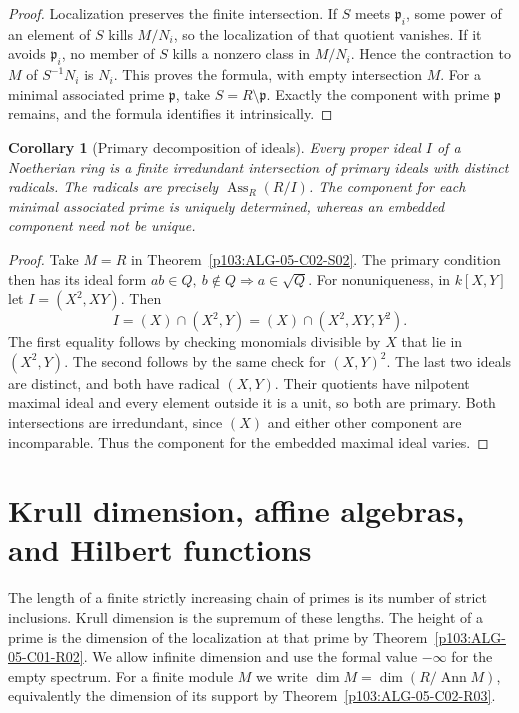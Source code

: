 \documentclass[11pt,oneside,openany]{book}
\newtheorem{corollary}[theorem]{Corollary}
\theoremstyle{definition}
\theoremstyle{remark}
\begin{document}
\begin{proof}
Localization preserves the finite intersection. If \(S\) meets \(\mathfrak p_i\), some power of an element of \(S\) kills \(M/N_i\), so the localization of that quotient vanishes. If it avoids \(\mathfrak p_i\), no member of \(S\) kills a nonzero class in \(M/N_i\). Hence the contraction to \(M\) of \(S^{-1}N_i\) is \(N_i\). This proves the formula, with empty intersection \(M\). For a minimal associated prime \(\mathfrak p\), take \(S=R\setminus\mathfrak p\). Exactly the component with prime \(\mathfrak p\) remains, and the formula identifies it intrinsically.
\end{proof}

\begin{corollary}[Primary decomposition of ideals]\label{p103:ALG-05-C02-R02}
Every proper ideal \(I\) of a Noetherian ring is a finite irredundant intersection of primary ideals with distinct radicals. The radicals are precisely \(\operatorname{Ass}_R(R/I)\). The component for each minimal associated prime is uniquely determined, whereas an embedded component need not be unique.
\end{corollary}
\begin{proof}
Take \(M=R\) in Theorem~\ref{p103:ALG-05-C02-S02}. The primary condition then has its ideal form \(ab\in Q,\ b\notin Q\Rightarrow a\in\sqrt Q\). For nonuniqueness, in \(k[X,Y]\) let \(I=(X^2,XY)\). Then
\[
 I=(X)\cap(X^2,Y)=(X)\cap(X^2,XY,Y^2).
\]
The first equality follows by checking monomials divisible by \(X\) that lie in \((X^2,Y)\). The second follows by the same check for \((X,Y)^2\). The last two ideals are distinct, and both have radical \((X,Y)\). Their quotients have nilpotent maximal ideal and every element outside it is a unit, so both are primary. Both intersections are irredundant, since \((X)\) and either other component are incomparable. Thus the component for the embedded maximal ideal varies.
\end{proof}
\chapter[Krull dimension and Hilbert functions]
{Krull dimension, affine algebras, and Hilbert functions}
\label{p103:ch06}

The length of a finite strictly increasing chain of primes is its number of strict inclusions. Krull dimension is the supremum of these lengths. The height of a prime is the dimension of the localization at that prime by Theorem~\ref{p103:ALG-05-C01-R02}. We allow infinite dimension and use the formal value \(-\infty\) for the empty spectrum. For a finite module \(M\) we write \(\dim M=\dim(R/\operatorname{Ann}M)\), equivalently the dimension of its support by Theorem~\ref{p103:ALG-05-C02-R03}.
\end{document}
